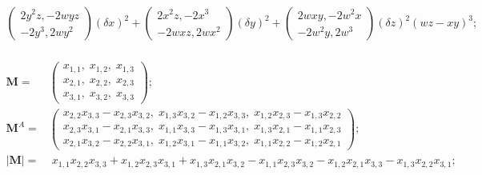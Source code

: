 \documentclass[twoside]{article}
\numberwithin{equation}{section}
\begin{document}
\begin{align*}
{	 	\left( \begin{matrix} 2 y^2 z, - 2 w y z \\  -2 y^3, 2 w y^2 \end{matrix} \right) (\delta x)^2 +
	 	\left( \begin{matrix} 2 x^2 z, - 2 x^3 \\  - 2 w x z, 2 w x^2 \end{matrix} \right) (\delta y)^2 +
	 	\left( \begin{matrix} 2 w x y, - 2 w^2 x \\ -2 w^2 y, 2 w^3 \end{matrix} \right) (\delta z)^2
	}{(w z - x y)^3}; \\
\end{align*}

\begin{align*}
\mathbf{M} =& \left( \begin{matrix} x_{1,1},\; x_{1,2},\; x_{1,3} \\ x_{2,1},\; x_{2,2},\; x_{2,3} \\ x_{3,1},\; x_{3,2},\; x_{3,3} \end{matrix} \right); \\
\mathbf{M}^A =& \left( \begin{matrix} 
		x_{2,2} x_{3,3} - x_{2,3} x_{3,2},\; x_{1,3} x_{3,2} - x_{1,2} x_{3,3},\; x_{1,2} x_{2,3} - x_{1,3} x_{2,2} \\ 
		x_{2,3} x_{3,1} - x_{2,1} x_{3,3},\; x_{1,1} x_{3,3} - x_{1,3} x_{3,1},\; x_{1,3} x_{2,1} - x_{1,1} x_{2,3} \\ 
		x_{2,1} x_{3,2} - x_{2,2} x_{3,1},\; x_{1,2} x_{3,1} - x_{1,1} x_{3,2},\; x_{1,1} x_{2,2} - x_{1,2} x_{2,1} 
\end{matrix} \right); \\
|\mathbf{M}| =&\; x_{1,1} x_{2,2} x_{3,3} + x_{1,2} x_{2,3} x_{3,1} + x_{1,3} x_{2,1} x_{3,2} -
						x_{1,1} x_{2,3} x_{3,2} - x_{1,2} x_{2,1} x_{3,3} - x_{1,3} x_{2,2} x_{3,1}; 
\end{align*}
\end{document}
